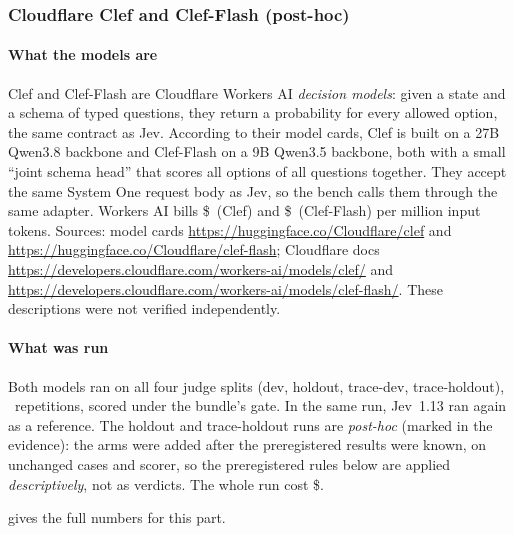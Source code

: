 \subsubsection{Cloudflare Clef and Clef-Flash \texorpdfstring{\screen}{[screen]} (post-hoc)}\label{vt:sec:clef}

{\raggedright
\paragraph{What the models are} Clef and Clef-Flash are Cloudflare Workers AI \emph{decision models}: given a state
and a schema of typed questions, they return a probability for every allowed option, the same contract as Jev.
According to their model cards, Clef is built on a 27B Qwen3.8 backbone and Clef-Flash on a 9B Qwen3.5 backbone, both
with a small ``joint schema head'' that scores all options of all questions together. They accept the same System One
request body as Jev, so the bench calls them through the same adapter. Workers AI bills \$\ClClefPrice\ (Clef) and
\$\ClFlashPrice\ (Clef-Flash) per million input tokens. Sources: model cards
\url{https://huggingface.co/Cloudflare/clef} and \url{https://huggingface.co/Cloudflare/clef-flash}; Cloudflare docs
\url{https://developers.cloudflare.com/workers-ai/models/clef/} and
\url{https://developers.cloudflare.com/workers-ai/models/clef-flash/}. These descriptions were not verified
independently.\par}

\paragraph{What was run} Both models ran on all four judge splits (dev, holdout, trace-dev, trace-holdout), \HoldReps\
repetitions, scored under the bundle's gate. In the same run, Jev~1.13 ran again as a reference. The holdout and
trace-holdout runs are \emph{post-hoc} (marked \code{posthoc: true} in the evidence): the arms were added after the
preregistered results were known, on unchanged cases and scorer, so the preregistered rules below are applied
\emph{descriptively}, not as verdicts. The whole run cost \$\ClSpend.

 gives the full numbers for this part.

\begin{table}[tbp]
\centering\scriptsize
\caption{Post-hoc run: Clef, Clef-Flash and the in-run Jev reference on all four splits (per-case majority over
\HoldReps\ repetitions; latency is client wall time from this Mac, network included).}
\label{vt:tab:clefresults}

\end{table}

